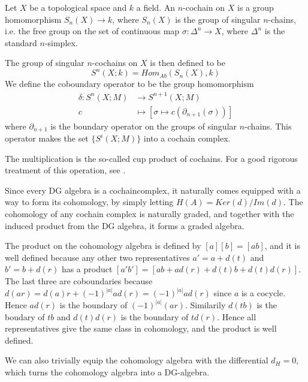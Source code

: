 \begin{example}
\label{ex:singular_cochain_algebra}
Let $X$ be a topological space and $k$ a field. An $n$-cochain on $X$ is a group homomorphism $S_n(X)\longrightarrow k$, where $S_n(X)$ is the group of singular $n$-chains, i.e. the free group on the set of continuous map $\sigma\colon\Delta^n\longrightarrow X$, where $\Delta^n$ is the standard $n$-simplex. 

The group of singular $n$-cochains on $X$ is then defined to be 
\begin{equation*}
S^n(X;k) = Hom_{Ab}(S_n(X), k)
\end{equation*}
We define the coboundary operator to be the group homomorphism
\begin{align*}
	\delta\colon S^n(X;M)&\longrightarrow S^{n+1}(X;M) \\
	c &\longmapsto [\sigma\mapsto c(\partial_{n+1}(\sigma))]
\end{align*}
where $\partial_{n+1}$ is the boundary operator on the groups of singular $n$-chains. This operator makes the set $\{S^i(X;M)\}$ into a cochain complex. 

The multiplication is the so-called cup product of cochains. For a good rigorous treatment of this operation, see \cite[Section 3.2.]{hatcher}. 
\end{example}

\begin{example}
\label{ex:cohomology}
Since every DG algebra is a cochaincomplex, it naturally comes equipped with a way to form its cohomology, by simply letting $H(A)=Ker(d)/Im(d)$. The cohomology of any cochain complex is naturally graded, and together with the induced product from the DG algebra, it forms a graded algebra. 
    
The product on the cohomology algebra is defined by $[a][b]=[ab]$, and it is well defined because any other two representatives $a'=a+d(t)$ and $b'=b+d(r)$ has a product $[a'b']=[ab+ad(r)+d(t)b+d(t)d(r)]$. The last three are coboundaries because $d(ar)=d(a)r + (-1)^{|a|}ad(r) = (-1)^{|a|}ad(r)$ since $a$ is a cocycle. Hence $ad(r)$ is the boundary of $(-1)^{|a|}(ar)$. Similarily $d(tb)$ is the boudary of $tb$ and $d(t)d(r)$ is the boundary of $td(r)$. Hence all representatives give the same class in cohomology, and the product is well defined. 
    
We can also trivially equip the cohomology algebra with the differential $d_H=0$, which turns the cohomology algebra into a DG-algebra. 
\end{example}

